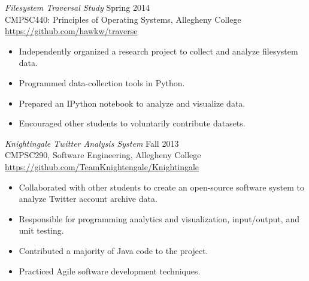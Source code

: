 \documentclass[margin]{res}
\begin{document}
\begin{resume}
                {\sl Filesystem Traversal Study} \hfill Spring 2014 \\ 
                CMPSC440: Principles of Operating Systems, Allegheny College \\
                \url{https://github.com/hawkw/traverse}
                 \begin{itemize} \itemsep -2pt %
                    \item Independently organized a research project to collect and analyze filesystem data.
                    \item Programmed data-collection tools in Python.
                    \item Prepared an IPython notebook to analyze and visualize data.
                    \item Encouraged other students to voluntarily contribute datasets.
                \end{itemize}

                {\sl Knightingale Twitter Analysis System} \hfill Fall 2013 \\
                CMPSC290, Software Engineering, Allegheny College \\
                \url{https://github.com/TeamKnightengale/Knightingale}
                 \begin{itemize}  \itemsep -2pt %
                    \item Collaborated with other students to create an open-source software system to analyze Twitter account archive data.
                    \item Responsible for programming analytics and visualization, input/output, and unit testing.
                    \item Contributed a majority of Java code to the project.
                    \item Practiced Agile software development techniques.
                \end{itemize}


\end{resume} 
\end{document}
